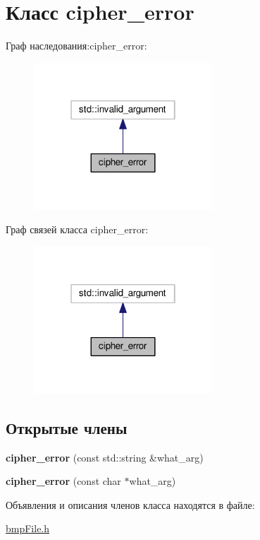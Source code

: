 \hypertarget{classcipher__error}{}\section{Класс cipher\+\_\+error}
\label{classcipher__error}


Граф наследования\+:cipher\+\_\+error\+:
\nopagebreak
\begin{figure}[H]
\begin{center}
\leavevmode
\includegraphics[width=190pt]{classcipher__error__inherit__graph}
\end{center}
\end{figure}


Граф связей класса cipher\+\_\+error\+:
\nopagebreak
\begin{figure}[H]
\begin{center}
\leavevmode
\includegraphics[width=190pt]{classcipher__error__coll__graph}
\end{center}
\end{figure}
\subsection*{Открытые члены}
\begin{DoxyCompactItemize}
\item 
\mbox{\label{classcipher__error_aac662e216a84bfeb873303c7b88d029e}} 
{\bfseries cipher\+\_\+error} (const std\+::string \&what\+\_\+arg)
\item 
\mbox{\label{classcipher__error_a18cf27d9c2cd2538d3cb8f17e9a55f3e}} 
{\bfseries cipher\+\_\+error} (const char $\ast$what\+\_\+arg)
\end{DoxyCompactItemize}


Объявления и описания членов класса находятся в файле\+:\begin{DoxyCompactItemize}
\item 
\hyperlink{bmpFile_8h}{bmp\+File.\+h}\end{DoxyCompactItemize}
